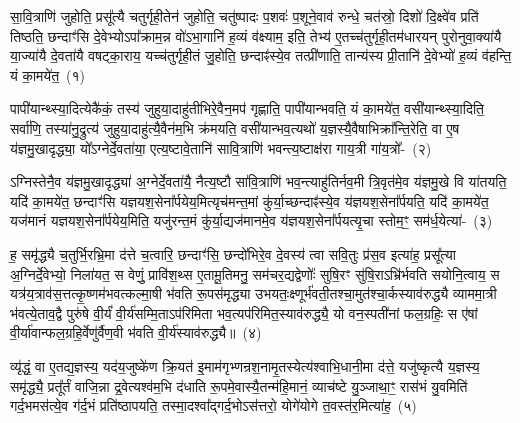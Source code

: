 \label{sec:startkanda5}
\setcounter{anuvakam}{0}
सा॒वि॒त्राणि॑ जुहोति॒ प्रसू᳚त्यै चतुर्गृही॒तेन॑ जुहोति॒ चतु॑ष्पादः प॒शवः॑ प॒शूने॒वाव॑ रुन्धे॒ चत॑स्रो॒ दिशो॑ दि॒क्ष्वे॑व प्रति॑ तिष्ठति॒ छन्दाꣳ॑सि दे॒वेभ्यो\-ऽपा᳚क्राम॒न्न वो॑\-ऽभा॒गानि॑ ह॒व्यं व॑क्ष्याम॒ इति॒ तेभ्य॑ ए॒तच्च॑तुर्गृही॒तम॑धारयन् पुरोनुवा॒क्या॑यै या॒ज्या॑यै दे॒वता॑यै वषट्का॒राय॒ यच्च॑तुर्गृही॒तं जु॒होति॒ छन्दाꣴ॑स्ये॒व तत्प्री॑णाति॒ तान्य॑स्य प्री॒तानि॑ दे॒वेभ्यो॑ ह॒व्यं व॑हन्ति॒ यं का॒मये॑त॒~(१)\ip

पापी॑यान्थ्स्या॒दित्येकै॑कं॒ तस्य॑ जुहुया॒दाहु॑तीभिरे॒वैन॒मप॑ गृह्णाति॒ पापी॑यान्भवति॒ यं का॒मये॑त॒ वसी॑यान्थ्स्या॒दिति॒ सर्वा॑णि॒ तस्या॑नु॒द्रुत्य॑ जुहुया॒दाहु॑त्यै॒वैन॑म॒भि क्र॑मयति॒ वसी॑यान्भव॒त्यथो॑ य॒ज्ञस्यै॒वैषाभिक्रा᳚न्ति॒रेति॒ वा ए॒ष य॑ज्ञमु॒खादृद्ध्या॒ यो᳚\-ऽग्नेर्दे॒वता॑या॒ एत्य॒ष्टावे॒तानि॑ सावि॒त्राणि॑ भवन्त्य॒ष्टाक्ष॑रा गाय॒त्री गा॑य॒त्रो᳚-~(२)\ip

ऽग्निस्तेनै॒व य॑ज्ञमु॒खादृद्ध्या॑ अ॒ग्नेर्दे॒वता॑यै॒ नैत्य॒ष्टौ सा॑वि॒त्राणि॑ भव॒न्त्याहु॑तिर्नव॒मी त्रि॒वृत॑मे॒व य॑ज्ञमु॒खे वि या॑तयति॒ यदि॑ का॒मये॑त॒ छन्दाꣳ॑सि यज्ञयश॒सेना᳚र्पयेय॒मित्यृच॑मन्त॒मां कु॑र्या॒च्छन्दाꣴ॑स्ये॒व य॑ज्ञयश॒सेना᳚र्पयति॒ यदि॑ का॒मये॑त॒ यज॑मानं यज्ञयश॒सेना᳚र्पयेय॒मिति॒ यजु॑रन्त॒मं कु॑र्या॒द्यज॑मानमे॒व य॑ज्ञयश॒सेना᳚र्पयत्यृ॒चा स्तोम॒ꣳ॒ सम॑र्ध॒येत्या॑-~(३)\ip

ह॒ समृ॑द्ध्यै च॒तुर्भि॒रभ्रि॒मा द॑त्ते च॒त्वारि॒ छन्दाꣳ॑सि॒ छन्दो॑भिरे॒व दे॒वस्य॑ त्वा सवि॒तुः प्र॑स॒व इत्या॑ह॒ प्रसू᳚त्या अ॒ग्निर्दे॒वेभ्यो॒ निला॑यत॒ स वेणुं॒ प्रावि॑श॒थ्स ए॒तामू॒तिमनु॒ सम॑चर॒द्यद्वेणोः᳚ सुषि॒रꣳ सु॑षि॒रा\-ऽ\-भ्रि॑र्भवति सयोनि॒त्वाय॒ स यत्र॑य॒त्राव॑स॒त्तत्कृ॒ष्णम॑भवत्कल्मा॒षी भ॑वति रू॒पस॑मृद्ध्या उभयतः॒क्ष्णूर्भ॑वती॒तश्चा॒मुत॑श्चा॒र्कस्याव॑रुद्ध्यै व्याममा॒त्री भ॑वत्ये॒ताव॒द्वै पुरु॑षे वी॒र्यं॑ वी॒र्य॑सम्मि॒ता\-ऽप॑रिमिता भव॒त्यप॑रिमित॒स्याव॑रुद्ध्यै॒ यो वन॒स्पती॑नां फल॒ग्रहिः॒ स ए॑षां वी॒र्या॑वान्फल॒ग्रहि॒र्वेणु॑र्वैण॒वी भ॑वति वी॒र्य॑स्याव॑रुद्ध्यै॥~(४)\ip

{\anuvakamend[{का॒मये॑त गाय॒त्रो᳚\-ऽर्ध॒येति॑ च स॒प्तविꣳ॑शतिश्च}]}

व्यृ॑द्धं॒ वा ए॒तद्य॒ज्ञस्य॒ यद॑य॒जुष्के॑ण क्रि॒यत॑ इ॒माम॑गृभ्णन्रश॒नामृ॒तस्येत्य॑श्वाभि॒धानी॒मा द॑त्ते॒ यजु॑ष्कृत्यै य॒ज्ञस्य॒ समृ॑द्ध्यै॒ प्रतू᳚र्तं वाजि॒न्ना द्र॒वेत्यश्व॑म॒भि द॑धाति रू॒पमे॒वास्यै॒तन्म॑हि॒मानं॒ व्याच॑ष्टे यु॒ञ्जाथा॒ꣳ॒ रास॑भं यु॒वमिति॑ गर्द॒भमस॑त्ये॒व ग॑र्द॒भं प्रति॑\-ष्ठापयति॒ तस्मा॒दश्वा᳚द्गर्द॒भो\-ऽस॑त्तरो॒ योगे॑योगे त॒वस्त॑र॒मित्या॑ह॒~(५)\ip

